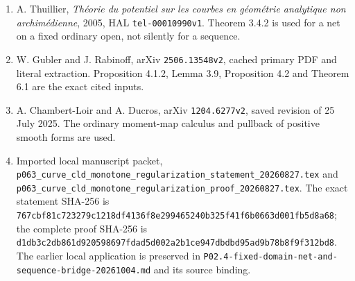 \documentclass[
  11pt,
]{article}
\providecommand{\tightlist}{%
  \setlength{\itemsep}{0pt}\setlength{\parskip}{0pt}}
\begin{document}
\begin{enumerate}
\def\labelenumi{\arabic{enumi}.}
\tightlist
\item
  A. Thuillier, \emph{Théorie du potentiel sur les courbes en géométrie
  analytique non archimédienne}, 2005, HAL \texttt{tel-00010990v1}.
  Theorem 3.4.2 is used for a net on a fixed ordinary open, not silently
  for a sequence.
\item
  W. Gubler and J. Rabinoff, arXiv \texttt{2506.13548v2}, cached primary
  PDF and literal extraction. Proposition 4.1.2, Lemma 3.9, Proposition
  4.2 and Theorem 6.1 are the exact cited inputs.
\item
  A. Chambert-Loir and A. Ducros, arXiv \texttt{1204.6277v2}, saved
  revision of 25 July 2025. The ordinary moment-map calculus and
  pullback of positive smooth forms are used.
\item
  Imported local manuscript packet,
  \nolinkurl{p063_curve_cld_monotone_regularization_statement_20260827.tex}
  and
  \nolinkurl{p063_curve_cld_monotone_regularization_proof_20260827.tex}.
  The exact statement SHA-256 is
  \nolinkurl{767cbf81c723279c1218df4136f8e299465240b325f41f6b0663d001fb5d8a68};
  the complete proof SHA-256 is
  \nolinkurl{d1db3c2db861d920598697fdad5d002a2b1ce947dbdbd95ad9b78b8f9f312bd8}.
  The earlier local application is preserved in
  \nolinkurl{P02.4-fixed-domain-net-and-sequence-bridge-20261004.md} and
  its source binding.
\end{enumerate}
\end{document}
